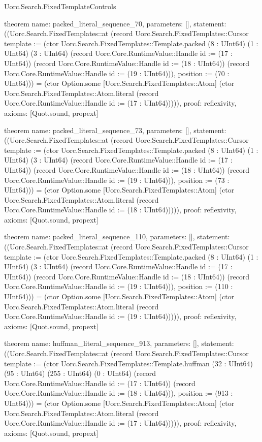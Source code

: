 \begin{lexlean}{Uorc.Search.FixedTemplateControls}
\begin{semanticmodule}
theorem{
  name: packed_literal_sequence_70,
  parameters: [],
  statement: ((Uorc.Search.FixedTemplates::at (record Uorc.Search.FixedTemplates::Cursor {template := (ctor Uorc.Search.FixedTemplates::Template.packed (8 : UInt64) (1 : UInt64) (3 : UInt64) (record Uorc.Core.RuntimeValue::Handle {id := (17 : UInt64)}) (record Uorc.Core.RuntimeValue::Handle {id := (18 : UInt64)}) (record Uorc.Core.RuntimeValue::Handle {id := (19 : UInt64)})), position := (70 : UInt64)})) = (ctor Option.some [Uorc.Search.FixedTemplates::Atom] (ctor Uorc.Search.FixedTemplates::Atom.literal (record Uorc.Core.RuntimeValue::Handle {id := (17 : UInt64)})))),
  proof: reflexivity{},
  axioms: [Quot.sound, propext]
}

theorem{
  name: packed_literal_sequence_73,
  parameters: [],
  statement: ((Uorc.Search.FixedTemplates::at (record Uorc.Search.FixedTemplates::Cursor {template := (ctor Uorc.Search.FixedTemplates::Template.packed (8 : UInt64) (1 : UInt64) (3 : UInt64) (record Uorc.Core.RuntimeValue::Handle {id := (17 : UInt64)}) (record Uorc.Core.RuntimeValue::Handle {id := (18 : UInt64)}) (record Uorc.Core.RuntimeValue::Handle {id := (19 : UInt64)})), position := (73 : UInt64)})) = (ctor Option.some [Uorc.Search.FixedTemplates::Atom] (ctor Uorc.Search.FixedTemplates::Atom.literal (record Uorc.Core.RuntimeValue::Handle {id := (18 : UInt64)})))),
  proof: reflexivity{},
  axioms: [Quot.sound, propext]
}

theorem{
  name: packed_literal_sequence_110,
  parameters: [],
  statement: ((Uorc.Search.FixedTemplates::at (record Uorc.Search.FixedTemplates::Cursor {template := (ctor Uorc.Search.FixedTemplates::Template.packed (8 : UInt64) (1 : UInt64) (3 : UInt64) (record Uorc.Core.RuntimeValue::Handle {id := (17 : UInt64)}) (record Uorc.Core.RuntimeValue::Handle {id := (18 : UInt64)}) (record Uorc.Core.RuntimeValue::Handle {id := (19 : UInt64)})), position := (110 : UInt64)})) = (ctor Option.some [Uorc.Search.FixedTemplates::Atom] (ctor Uorc.Search.FixedTemplates::Atom.literal (record Uorc.Core.RuntimeValue::Handle {id := (19 : UInt64)})))),
  proof: reflexivity{},
  axioms: [Quot.sound, propext]
}

theorem{
  name: huffman_literal_sequence_913,
  parameters: [],
  statement: ((Uorc.Search.FixedTemplates::at (record Uorc.Search.FixedTemplates::Cursor {template := (ctor Uorc.Search.FixedTemplates::Template.huffman (32 : UInt64) (95 : UInt64) (255 : UInt64) (0 : UInt64) (record Uorc.Core.RuntimeValue::Handle {id := (17 : UInt64)}) (record Uorc.Core.RuntimeValue::Handle {id := (18 : UInt64)})), position := (913 : UInt64)})) = (ctor Option.some [Uorc.Search.FixedTemplates::Atom] (ctor Uorc.Search.FixedTemplates::Atom.literal (record Uorc.Core.RuntimeValue::Handle {id := (17 : UInt64)})))),
  proof: reflexivity{},
  axioms: [Quot.sound, propext]
}


\end{semanticmodule}
\end{lexlean}
